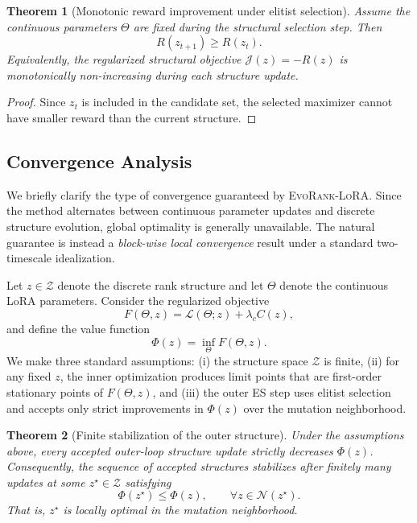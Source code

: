 \documentclass{article}
\newtheorem{theorem}{Theorem}
\newcommand{\method}{\textsc{EvoRank-LoRA}}
\begin{document}
\begin{theorem}[Monotonic reward improvement under elitist selection]
\label{thm:elitist_monotonicity}
Assume the continuous parameters $\Theta$ are fixed during the structural selection step. Then
\begin{equation}
    R(z_{t+1}) \ge R(z_t).
\end{equation}
Equivalently, the regularized structural objective $\mathcal{J}(z) = -R(z)$ is monotonically non-increasing during each structure update.
\end{theorem}

\begin{proof}
Since $z_t$ is included in the candidate set, the selected maximizer cannot have smaller reward than the current structure.
\end{proof}



\subsection{Convergence Analysis}
We briefly clarify the type of convergence guaranteed by \method. Since the method alternates between continuous parameter updates and discrete structure evolution, global optimality is generally unavailable. The natural guarantee is instead a \emph{block-wise local convergence} result under a standard two-timescale idealization.

Let $z \in \mathcal{Z}$ denote the discrete rank structure and let $\Theta$ denote the continuous LoRA parameters. Consider the regularized objective
\begin{equation}
    F(\Theta, z) = \mathcal{L}(\Theta; z) + \lambda_c C(z),
\end{equation}
and define the value function
\begin{equation}
    \Phi(z) = \inf_{\Theta} F(\Theta, z).
\end{equation}
We make three standard assumptions: (i) the structure space $\mathcal{Z}$ is finite, (ii) for any fixed $z$, the inner optimization produces limit points that are first-order stationary points of $F(\Theta,z)$, and (iii) the outer ES step uses elitist selection and accepts only strict improvements in $\Phi(z)$ over the mutation neighborhood.

\begin{theorem}[Finite stabilization of the outer structure]
\label{thm:outer_stabilization}
Under the assumptions above, every accepted outer-loop structure update strictly decreases $\Phi(z)$. Consequently, the sequence of accepted structures stabilizes after finitely many updates at some $z^\star \in \mathcal{Z}$ satisfying
\begin{equation}
    \Phi(z^\star) \le \Phi(z), \qquad \forall z \in \mathcal{N}(z^\star).
\end{equation}
That is, $z^\star$ is locally optimal in the mutation neighborhood.
\end{theorem}
\end{document}
